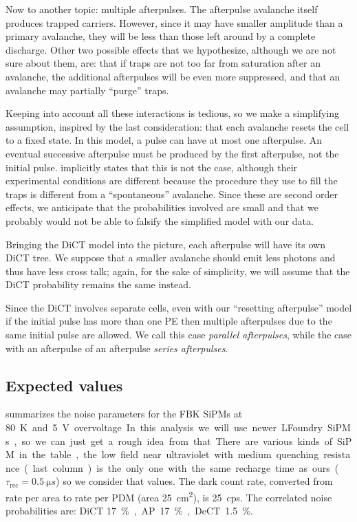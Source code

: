 Now to another topic: multiple afterpulses. The afterpulse avalanche itself
produces trapped carriers. However, since it may have smaller amplitude than a
primary avalanche, they will be less than those left around by a complete
discharge. Other two possible effects that we hypothesize, although we are not
sure about them, are: that if traps are not too far from saturation after an
avalanche, the additional afterpulses will be even more suppressed, and that an
avalanche may partially ``purge'' traps.

Keeping into account all these interactions is tedious, so we make a
simplifying assumption, inspired by the last consideration: that each avalanche
resets the cell to a fixed state. In this model, a pulse can have at most one
afterpulse. An eventual successive afterpulse must be produced by the first
afterpulse, not the initial pulse. \cite{cova1991} implicitly states that this
is not the case, although their experimental conditions are different because
the procedure they use to fill the traps is different from a ``spontaneous''
avalanche. Since these are second order effects, we anticipate that the
probabilities involved are small and that we probably would not be able to
falsify the simplified model with our data.

Bringing the DiCT model into the picture, each afterpulse will have its own
DiCT tree. We suppose that a smaller avalanche should emit less photons and
thus have less cross talk; again, for the sake of simplicity, we will assume
that the DiCT probability remains the same instead.

Since the DiCT involves separate cells, even with our ``resetting afterpulse''
model if the initial pulse has more than one PE then multiple afterpulses due
to the same initial pulse are allowed. We call this case \emph{parallel
afterpulses}, while the case with an afterpulse of an afterpulse \emph{series
afterpulses}.

\subsection{Expected values}
\label{sec:expval}

\cite[tab.~3.1~p.~62]{savarese2018} summarizes the noise parameters for the FBK
SiPMs at \SI{80}K and \SI{5}V overvoltage. In this analysis we will use newer
LFoundry SiPMs, so we can just get a rough idea from that. There are various
kinds of SiPM in the table, the low field near ultraviolet with medium
quenching resistance (last column) is the only one with the same recharge time
as ours ($\tau_\text{rec} = \SI{0.5}{\micro s}$) so we consider that values.
The dark count rate, converted from rate per area to rate per PDM (area
\SI{25}{cm^2}), is \SI{25}{cps}. The correlated noise probabilities are: DiCT
\SI{17}\%, AP \SI{17}\%, DeCT \SI{1.5}\%.

